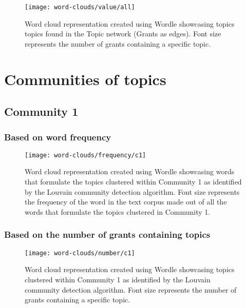 \begin{figure}[htbp]
    \centering
    \texttt{[image: word-clouds/value/all]}
    \caption[Word cloud representation based on the value of grants containing topics found in the Topic network (Grants as edges)]{Word cloud representation created using Wordle showcasing topics topics found in the Topic network (Grants as edges). Font size represents the number of grants containing a specific topic.}
    \label{fig:topic_grant_value_all}
\end{figure}

\section{Communities of topics}

\subsection{Community 1}

\subsubsection{Based on word frequency}

\begin{figure}[htbp]
    \centering
    \texttt{[image: word-clouds/frequency/c1]}
    \caption[Word cloud representation based on word frequency showcasing words that formulate the topics clustered within Community 1]{Word cloud representation created using Wordle showcasing words that formulate the topics clustered within Community 1 as identified by the Louvain community detection algorithm. Font size represents the frequency of the word in the text corpus made out of all the words that formulate the topics clustered in Community 1.}
    \label{fig:topic_grant_freq_c1_appendix}
\end{figure}

\clearpage

\subsubsection{Based on the number of grants containing topics}

\begin{figure}[htbp]
    \centering
    \texttt{[image: word-clouds/number/c1]}
    \caption[Word cloud representation based on the number of grants containing topics clustered within Community 1]{Word cloud representation created using Wordle showcasing topics clustered within Community 1 as identified by the Louvain community detection algorithm. Font size represents the number of grants containing a specific topic.}
    \label{fig:topic_grant_number_c1_appendix}
\end{figure}

